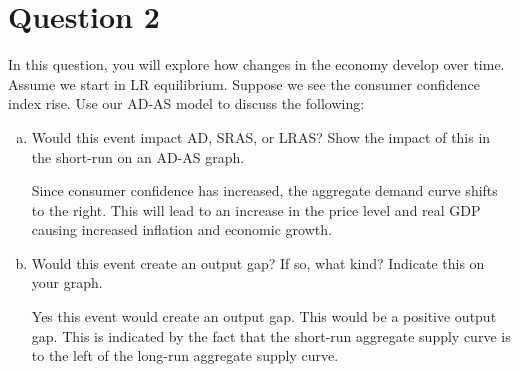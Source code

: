 \documentclass{article}
\newcommand{\question}[1]{\pagebreak\section{Question #1}}
\begin{document}
\pagebreak
\question{2}
In this question, you will explore how changes in the economy develop
over time. Assume we start in LR equilibrium. Suppose we see the
consumer confidence index rise. Use our AD-AS model to discuss the
following: 


\begin{enumerate}[(a)]
    \item Would this event impact AD, SRAS, or LRAS? Show the impact of this in the short-run on an AD-AS graph.
    


    Since consumer confidence has increased, the aggregate demand curve shifts to the right. This will lead to an increase in the price level and real GDP causing increased inflation and economic growth.


    \item Would this event create an output gap? If so, what kind? Indicate this on your graph.
    
    Yes this event would create an output gap. This would be a positive output gap. This is indicated by the fact that the short-run aggregate supply curve is to the left of the long-run aggregate supply curve.



\end{enumerate}
\end{document}
